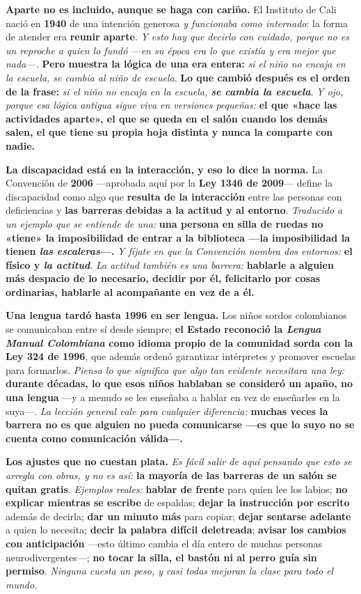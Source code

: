 \documentclass[11pt,letterpaper]{article}
\newcommand{\milcpaso}[3]{%
\Needspace{4\baselineskip}%
\begin{tcolorbox}[enhanced,colback=white,colframe=milcLinea,arc=1.5mm,boxrule=.9pt,
  left=14mm,right=4mm,top=3mm,bottom=3mm,before skip=4pt,after skip=4pt,
  fontupper=\RaggedRight,
  overlay={\node[anchor=north west,circle,fill=#2,text=white,inner sep=0pt,
    minimum size=7.4mm,font=\sffamily\bfseries\small]
    at ([xshift=3.6mm,yshift=-3.2mm]frame.north west) {#1};}]
#3
\end{tcolorbox}}
\begin{document}
\milcpaso{1}{milcTurquesa}{\textbf{Aparte no es incluido, aunque se haga con cariño.} El Instituto de Cali nació en \textbf{1940} de una intención generosa \emph{y funcionaba como internado}: la forma de atender era \textbf{reunir aparte}. \emph{Y esto hay que decirlo con cuidado, porque no es un reproche a quien lo fundó ---en su época era lo que existía y era mejor que nada---.} \textbf{Pero muestra la lógica de una era entera:} \emph{si el niño no encaja en la escuela, se cambia al niño de escuela}. \textbf{Lo que cambió después es el orden de la frase:} \emph{si el niño no encaja en la escuela, \textbf{se cambia la escuela}}. \emph{Y ojo, porque esa lógica antigua sigue viva en versiones pequeñas:} \textbf{el que «hace las actividades aparte», el que se queda en el salón cuando los demás salen, el que tiene su propia hoja distinta y nunca la comparte con nadie.}}
\milcpaso{2}{milcTurquesa}{\textbf{La discapacidad está en la interacción, y eso lo dice la norma.} La Convención de \textbf{2006} ---aprobada aquí por la \textbf{Ley 1346 de 2009}--- define la discapacidad como algo que \textbf{resulta de la interacción} entre las personas con deficiencias y \textbf{las barreras debidas a la actitud y al entorno}. \emph{Traducido a un ejemplo que se entiende de una:} \textbf{una persona en silla de ruedas no «tiene» la imposibilidad de entrar a la biblioteca ---la imposibilidad la tienen \emph{las escaleras}---.} \emph{Y fíjate en que la Convención nombra dos entornos:} \textbf{el físico y \emph{la actitud}}. \emph{La actitud también es una barrera:} \textbf{hablarle a alguien más despacio de lo necesario, decidir por él, felicitarlo por cosas ordinarias, hablarle al acompañante en vez de a él.}}
\milcpaso{3}{milcTurquesa}{\textbf{Una lengua tardó hasta 1996 en ser lengua.} Los niños sordos colombianos se comunicaban entre sí desde siempre; \textbf{el Estado reconoció la \emph{Lengua Manual Colombiana} como idioma propio de la comunidad sorda con la Ley 324 de 1996}, que además ordenó garantizar intérpretes y promover escuelas para formarlos. \emph{Piensa lo que significa que algo tan evidente necesitara una ley:} \textbf{durante décadas, lo que esos niños hablaban se consideró un apaño, no una lengua} ---y a menudo se les enseñaba a hablar en vez de enseñarles en la suya---. \emph{La lección general vale para cualquier diferencia:} \textbf{muchas veces la barrera no es que alguien no pueda comunicarse ---es que lo suyo no se cuenta como comunicación válida---.}}
\milcpaso{4}{milcTurquesa}{\textbf{Los ajustes que no cuestan plata.} \emph{Es fácil salir de aquí pensando que esto se arregla con obras, y no es así:} \textbf{la mayoría de las barreras de un salón se quitan gratis}. \emph{Ejemplos reales:} \textbf{hablar de frente} para quien lee los labios; \textbf{no explicar mientras se escribe} de espaldas; \textbf{dejar la instrucción por escrito} además de decirla; \textbf{dar un minuto más} para copiar; \textbf{dejar sentarse adelante} a quien lo necesita; \textbf{decir la palabra difícil deletreada}; \textbf{avisar los cambios con anticipación} ---esto último cambia el día entero de muchas personas neurodivergentes---; \textbf{no tocar la silla, el bastón ni al perro guía sin permiso}. \emph{Ninguna cuesta un peso, y casi todas mejoran la clase para todo el mundo.}}
\end{document}
